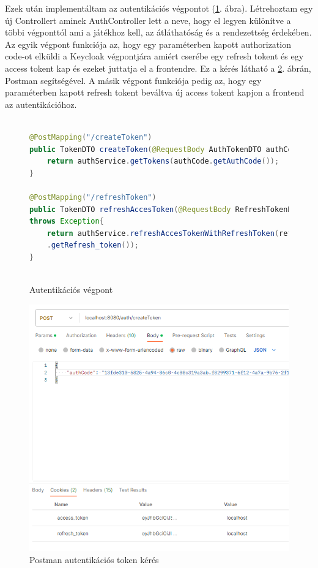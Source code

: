 \documentclass[a4paper,twoside]{article}
\begin{document}
Ezek után implementáltam az autentikációs végpontot (\ref{authEndpoint}. ábra). Létrehoztam egy új Controllert aminek AuthController lett a neve,
hogy el legyen különítve a többi végponttól ami a játékhoz kell, az átláthatóság és a rendezettség érdekében. Az egyik végpont 
funkciója az, hogy egy paraméterben kapott authorization code-ot elküldi a Keycloak végpontjára amiért cserébe egy refresh tokent és egy access tokent kap és ezeket juttatja el a frontendre. Ez a kérés látható a \ref{fig:postman}. ábrán, Postman segítségével.
A másik végpont funkciója pedig az, hogy egy paraméterben kapott refresh tokent beváltva új access tokent kapjon a frontend az autentikációhoz. 

\begin{figure}
	\caption{Autentikációs végpont}
	\centering
	\begin{lstlisting}[language=java,breaklines=true]
		
@PostMapping("/createToken")
public TokenDTO createToken(@RequestBody AuthTokenDTO authCode) throws Exception{
	return authService.getTokens(authCode.getAuthCode());
}		

@PostMapping("/refreshToken")
public TokenDTO refreshAccesToken(@RequestBody RefreshTokenDTO refreshTokenDTO)
throws Exception{
	return authService.refreshAccesTokenWithRefreshToken(refreshTokenDTO
	.getRefresh_token());
}
		
	\end{lstlisting}
	\label{authEndpoint}
\end{figure} 

\begin{figure}
	\caption{Postman autentikációs token kérés}
	\label{fig:postman}
	\centering
	\includegraphics[scale=0.5]{getTokens}
\end{figure}
\end{document}

